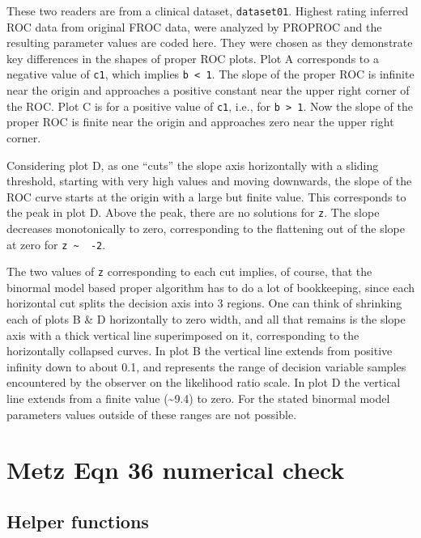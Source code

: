 \documentclass[
]{book}
\begin{document}
These two readers are from a clinical dataset, \texttt{dataset01}. Highest rating inferred ROC data from original FROC data, were analyzed by PROPROC and the resulting parameter values are coded here. They were chosen as they demonstrate key differences in the shapes of proper ROC plots. Plot A corresponds to a negative value of \texttt{c1}, which implies \texttt{b\ \textless{}\ 1}. The slope of the proper ROC is infinite near the origin and approaches a positive constant near the upper right corner of the ROC. Plot C is for a positive value of \texttt{c1}, i.e., for \texttt{b\ \textgreater{}\ 1}. Now the slope of the proper ROC is finite near the origin and approaches zero near the upper right corner.

Considering plot D, as one ``cuts'' the slope axis horizontally with a sliding threshold, starting with very high values and moving downwards, the slope of the ROC curve starts at the origin with a large but finite value. This corresponds to the peak in plot D. Above the peak, there are no solutions for \texttt{z}. The slope decreases monotonically to zero, corresponding to the flattening out of the slope at zero for \texttt{z\ \textasciitilde{}\ \ -2}.

The two values of \texttt{z} corresponding to each cut implies, of course, that the binormal model based proper algorithm has to do a lot of bookkeeping, since each horizontal cut splits the decision axis into 3 regions. One can think of shrinking each of plots B \& D horizontally to zero width, and all that remains is the slope axis with a thick vertical line superimposed on it, corresponding to the horizontally collapsed curves. In plot B the vertical line extends from positive infinity down to about 0.1, and represents the range of decision variable samples encountered by the observer on the likelihood ratio scale. In plot D the vertical line extends from a finite value (\textasciitilde9.4) to zero. For the stated binormal model parameters values outside of these ranges are not possible.

\hypertarget{metz-eqn-36}{%
\chapter{Metz Eqn 36 numerical check}\label{metz-eqn-36}}

\hypertarget{helper-functions-1}{%
\section{Helper functions}\label{helper-functions-1}}
\end{document}
